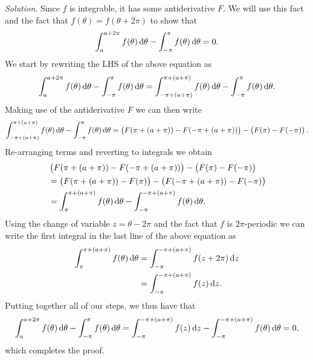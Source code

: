 \documentclass{article}
\begin{document}
\textit{Solution.} Since $f$ is integrable, it has some antiderivative
$F$. We will use this fact and the fact that $f(\theta) = f(\theta + 2
\pi)$ to show that
%
\begin{equation*}
    \int_a^{a + 2 \pi} f(\theta) \dif \theta - \int_{-\pi}^\pi f(\theta) \dif \theta = 0
    .
\end{equation*}
%
We start by rewriting the LHS of the above equation as
%
\begin{equation*}
    \int_a^{a + 2 \pi} f(\theta) \dif \theta - \int_{-\pi}^\pi f(\theta) \dif \theta
    =
    \int_{-\pi + (a + \pi)}^{\pi + (a + \pi)} f(\theta) \dif \theta - \int_{-\pi}^\pi f(\theta) \dif \theta
    .
\end{equation*}
%
Making use of the antiderivative $F$ we can then write
%
\begin{equation*}
    \int_{-\pi + (a + \pi)}^{\pi + (a + \pi)} f(\theta) \dif \theta - \int_{-\pi}^\pi f(\theta) \dif \theta
    =
    \del{F(\pi + (a + \pi)) - F(-\pi + (a + \pi))}
    -
    \del{F(\pi) - F(-\pi)}
    .
\end{equation*}
%
Re-arranging terms and reverting to integrals we obtain
%
\begin{align*}
    &\del{F(\pi + (a + \pi)) - F(-\pi + (a + \pi))}
    -
    \del{F(\pi) - F(-\pi)}
    \\
    &=
    \del{F(\pi + (a + \pi)) - F(\pi)}
    -
    \del{F(- \pi + (a + \pi)) - F(-\pi)}
    \\
    &=
    \int_{\pi}^{\pi + (a + \pi)} f(\theta) \dif \theta - \int_{-\pi}^{-\pi + (a + \pi)} f(\theta) \dif \theta
    .
\end{align*}
%
Using the change of variable $z = \theta - 2 \pi$ and the fact that $f$
is $2 \pi$-periodic we can write the first integral in the last line of
the above equation as
%
\begin{align*}
    \int_{\pi}^{\pi + (a + \pi)} f(\theta) \dif \theta
    &= \int_{- \pi}^{-\pi + (a + \pi)} f(z + 2 \pi) \dif z \\
    &= \int_{- \pi}^{-\pi + (a + \pi)} f(z) \dif z
    .
\end{align*}
%
Putting together all of our steps, we thus have that
%
\begin{equation*}
    \int_a^{a + 2 \pi} f(\theta) \dif \theta - \int_{-\pi}^\pi f(\theta) \dif \theta
    =
    \int_{- \pi}^{-\pi + (a + \pi)} f(z) \dif z
    - \int_{-\pi}^{-\pi + (a + \pi)} f(\theta) \dif \theta
    = 0
    ,
\end{equation*}
%
which completes the proof.
\end{document}
